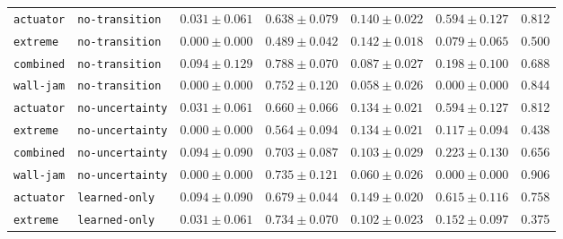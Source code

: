 \documentclass{article}
\begin{document}
\begin{center}
\begin{tabular}{llccccc}
\texttt{actuator} & \texttt{no-transition} & $0.031 \pm 0.061$ & $0.638 \pm 0.079$ & $0.140 \pm 0.022$ & $0.594 \pm 0.127$ & 0.812 \\
\texttt{extreme} & \texttt{no-transition} & $0.000 \pm 0.000$ & $0.489 \pm 0.042$ & $0.142 \pm 0.018$ & $0.079 \pm 0.065$ & 0.500 \\
\texttt{combined} & \texttt{no-transition} & $0.094 \pm 0.129$ & $0.788 \pm 0.070$ & $0.087 \pm 0.027$ & $0.198 \pm 0.100$ & 0.688 \\
\texttt{wall-jam} & \texttt{no-transition} & $0.000 \pm 0.000$ & $0.752 \pm 0.120$ & $0.058 \pm 0.026$ & $0.000 \pm 0.000$ & 0.844 \\
\texttt{actuator} & \texttt{no-uncertainty} & $0.031 \pm 0.061$ & $0.660 \pm 0.066$ & $0.134 \pm 0.021$ & $0.594 \pm 0.127$ & 0.812 \\
\texttt{extreme} & \texttt{no-uncertainty} & $0.000 \pm 0.000$ & $0.564 \pm 0.094$ & $0.134 \pm 0.021$ & $0.117 \pm 0.094$ & 0.438 \\
\texttt{combined} & \texttt{no-uncertainty} & $0.094 \pm 0.090$ & $0.703 \pm 0.087$ & $0.103 \pm 0.029$ & $0.223 \pm 0.130$ & 0.656 \\
\texttt{wall-jam} & \texttt{no-uncertainty} & $0.000 \pm 0.000$ & $0.735 \pm 0.121$ & $0.060 \pm 0.026$ & $0.000 \pm 0.000$ & 0.906 \\
\texttt{actuator} & \texttt{learned-only} & $0.094 \pm 0.090$ & $0.679 \pm 0.044$ & $0.149 \pm 0.020$ & $0.615 \pm 0.116$ & 0.758 \\
\texttt{extreme} & \texttt{learned-only} & $0.031 \pm 0.061$ & $0.734 \pm 0.070$ & $0.102 \pm 0.023$ & $0.152 \pm 0.097$ & 0.375 \\
\bottomrule
\end{tabular}
\end{center}
\end{document}
